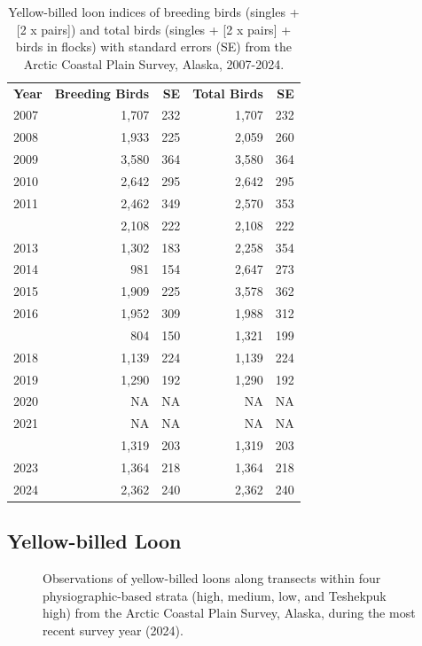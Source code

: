 \documentclass[
]{article}
\begin{document}
\begin{longtable}[t]{lrrrr}

\caption{\label{tbl-YBLO}Yellow-billed loon indices of breeding birds
(singles + {[}2 x pairs{]}) and total birds (singles + {[}2 x pairs{]} +
birds in flocks) with standard errors (SE) from the Arctic Coastal Plain
Survey, Alaska, 2007-2024.}

\tabularnewline

\\
\toprule
\textbf{Year} & \textbf{Breeding Birds} & \textbf{SE} & \textbf{Total Birds} & \textbf{SE}\\
\midrule
2007 & 1,707 & 232 & 1,707 & 232\\
2008 & 1,933 & 225 & 2,059 & 260\\
2009 & 3,580 & 364 & 3,580 & 364\\
2010 & 2,642 & 295 & 2,642 & 295\\
2011 & 2,462 & 349 & 2,570 & 353\\
\addlinespace
2012 & 2,108 & 222 & 2,108 & 222\\
2013 & 1,302 & 183 & 2,258 & 354\\
2014 & 981 & 154 & 2,647 & 273\\
2015 & 1,909 & 225 & 3,578 & 362\\
2016 & 1,952 & 309 & 1,988 & 312\\
\addlinespace
2017 & 804 & 150 & 1,321 & 199\\
2018 & 1,139 & 224 & 1,139 & 224\\
2019 & 1,290 & 192 & 1,290 & 192\\
2020 & NA & NA & NA & NA\\
2021 & NA & NA & NA & NA\\
\addlinespace
2022 & 1,319 & 203 & 1,319 & 203\\
2023 & 1,364 & 218 & 1,364 & 218\\
2024 & 2,362 & 240 & 2,362 & 240\\
\bottomrule

\end{longtable}

\endgroup{}

\newpage{}

\subsection*{Yellow-billed Loon}\label{yellow-billed-loon-2}

\begin{figure}


\caption{\label{fig-YBLOmap}Observations of yellow-billed loons along
transects within four physiographic-based strata (high, medium, low, and
Teshekpuk high) from the Arctic Coastal Plain Survey, Alaska, during the
most recent survey year (2024).}

\end{figure}%
\end{document}
